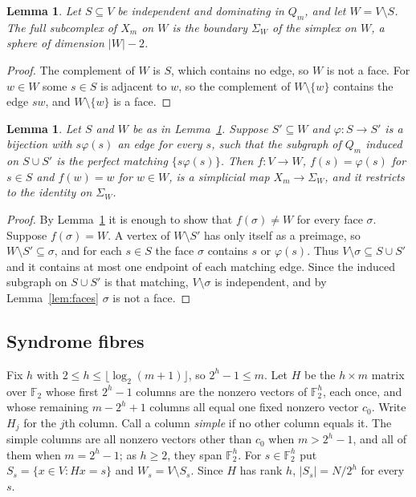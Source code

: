 \documentclass[11pt]{amsart}
\newtheorem{lemma}[theorem]{Lemma}
\theoremstyle{definition}
\theoremstyle{remark}
\newcommand{\Q}{Q}
\newcommand{\F}{\mathbb{F}}
\begin{document}
\begin{lemma}\label{lem:sphere}
Let $S\subseteq V$ be independent and dominating in $\Q_m$, and let $W=V\setminus S$. The full subcomplex of $X_m$ on
$W$ is the boundary $\Sigma_W$ of the simplex on $W$, a sphere of dimension $|W|-2$.
\end{lemma}

\begin{proof}
The complement of $W$ is $S$, which contains no edge, so $W$ is not a face. For $w\in W$ some $s\in S$ is adjacent to
$w$, so the complement of $W\setminus\{w\}$ contains the edge $sw$, and $W\setminus\{w\}$ is a face.
\end{proof}

\begin{lemma}\label{lem:retraction}
Let $S$ and $W$ be as in Lemma~\ref{lem:sphere}. Suppose $S'\subseteq W$ and $\varphi\colon S\to S'$ is a bijection with
$s\varphi(s)$ an edge for every $s$, such that the subgraph of $\Q_m$ induced on $S\cup S'$ is the perfect matching
$\{s\varphi(s)\}$. Then $f\colon V\to W$, $f(s)=\varphi(s)$ for $s\in S$ and $f(w)=w$ for $w\in W$, is a simplicial
map $X_m\to\Sigma_W$, and it restricts to the identity on $\Sigma_W$.
\end{lemma}

\begin{proof}
By Lemma~\ref{lem:sphere} it is enough to show that $f(\sigma)\ne W$ for every face $\sigma$. Suppose $f(\sigma)=W$.
A vertex of $W\setminus S'$ has only itself as a preimage, so $W\setminus S'\subseteq\sigma$, and for each $s\in S$ the
face $\sigma$ contains $s$ or $\varphi(s)$. Thus $V\setminus\sigma\subseteq S\cup S'$ and it contains at most one
endpoint of each matching edge. Since the induced subgraph on $S\cup S'$ is that matching, $V\setminus\sigma$ is
independent, and by Lemma~\ref{lem:faces} $\sigma$ is not a face.
\end{proof}

\subsection*{Syndrome fibres}
Fix $h$ with $2\le h\le\lfloor\log_2(m+1)\rfloor$, so $2^h-1\le m$. Let $H$ be the $h\times m$ matrix over $\F_2$ whose
first $2^h-1$ columns are the nonzero vectors of $\F_2^h$, each once, and whose remaining $m-2^h+1$ columns all equal
one fixed nonzero vector $c_0$. Write $H_j$ for the $j$th column. Call a column \emph{simple} if no other column equals
it. The simple columns are all nonzero vectors other than $c_0$ when $m>2^h-1$, and all of them when $m=2^h-1$; as
$h\ge2$, they span $\F_2^h$. For $s\in\F_2^h$ put $S_s=\{x\in V:Hx=s\}$ and $W_s=V\setminus S_s$. Since $H$ has rank
$h$, $|S_s|=N/2^h$ for every $s$.
\end{document}

